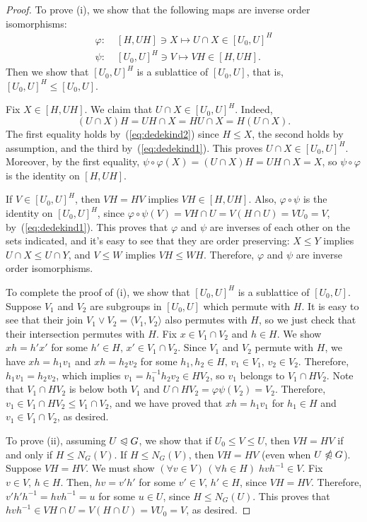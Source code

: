 \documentclass[cm,dissertation]{uhthesis}
\theoremstyle{plain}
\theoremstyle{definition}
\newcounter{claim}
\theoremstyle{remark}
\numberwithin{theorem}{section}
\numberwithin{claim}{chapter}
\numberwithin{equation}{section}
\numberwithin{conjecture}{chapter}
\newcommand{\<}{\ensuremath{\langle}}
\renewcommand{\>}{\ensuremath{\rangle}}
\renewcommand{\leq}{\ensuremath{\leqslant}}
\newcommand{\subnormal}{\ensuremath{\trianglelefteqslant}}
\newcommand{\notsubnormal}{\ensuremath{\ntrianglelefteqslant}}
\newcommand{\join}{\ensuremath{\vee}}
\newcommand{\0}{\ensuremath{\mathbf{0}}}
\newcommand{\1}{\ensuremath{\mathbf{1}}}
\newcommand{\2}{\ensuremath{\mathbf{2}}}
\newcommand{\3}{\ensuremath{\mathbf{3}}}
\newcommand{\4}{\ensuremath{\mathbf{4}}}
\newcommand{\5}{\ensuremath{\mathbf{5}}}
\renewcommand{\phi}{\ensuremath{\varphi}}
\begin{document}
\begin{proof}
To prove (i), we show that the following maps are inverse order isomorphisms:
\begin{align}
\label{eq:inverse-isos}
\phi: \;& [H, UH] \ni X \mapsto U\cap X \in [U_0, U]^H\\
\psi: \;& [U_0, U]^H \ni V \mapsto VH \in [H, UH].\nonumber
\end{align}
Then we show that $[U_0, U]^H$ is a sublattice of $[U_0,U]$, that is, 
$[U_0, U]^H\leq [U_0,U]$.

Fix $X\in [H, UH]$. We claim that $U\cap X \in [U_0, U]^H$. Indeed,
\[
    (U\cap X) H = UH \cap X=
               HU \cap X
                = H(U \cap X).
\]
The first equality holds by~(\ref{eq:dedekind2}) since $H\leq X$, the second holds
by assumption, and the third by~(\ref{eq:dedekind1}).
  This proves $U\cap X \in [U_0, U]^H$.  Moreover, by the first equality,
$\psi \circ \phi (X) = (U\cap X)H =UH \cap X = X$,
so $\psi \circ \phi$ is the identity on $[H, UH]$.

If $V\in [U_0, U]^H$, then $VH = HV$ implies $VH \in [H, UH]$. Also, $\phi \circ
\psi$ is the identity on $[U_0, U]^H$, since $\phi \circ \psi(V)= VH \cap U =
V(H\cap U)= VU_0 = V$, by~(\ref{eq:dedekind1}). 
This proves that $\phi$ and $\psi$ are inverses of each other on the sets indicated, and
it's easy to see that they are order preserving:
$X\leq Y$ implies $U\cap X \leq U\cap Y$, and $V\leq W$ implies $VH \leq WH$.
Therefore, $\phi$ and $\psi$ are inverse order isomorphisms.

To complete the proof of (i), we show that
$[U_0, U]^H$ is a sublattice of $[U_0, U]$.  Suppose $V_1$ and $V_2$ are
subgroups in $[U_0, U]$ which permute with $H$.  
It is easy to see that their join $V_1 \join V_2 = \<V_1, V_2\>$ also permutes
with $H$, so we just check that their intersection permutes with $H$.  Fix
$x \in V_1 \cap V_2$ and $h\in H$.  We show $xh = h'x'$ for some $h'\in H, \, x'
\in V_1\cap V_2$. Since $V_1$ and $V_2$ permute with $H$, we have $xh = h_1 v_1$
and $xh = h_2 v_2$ for some $h_1, h_2\in H, \, v_1 \in V_1, \, v_2 \in V_2$.
Therefore, $h_1 v_1 = h_2 v_2$, which implies $v_1 = h_1^{-1}h_2 v_2 \in HV_2$,
so $v_1$ belongs to $V_1 \cap HV_2$. Note that $V_1 \cap HV_2$ is below both $V_1$ and
$U\cap HV_2 = \phi \psi(V_2) = V_2$.  Therefore, $v_1 \in V_1 \cap HV_2 \leq V_1
\cap V_2$, and we have proved that $xh = h_1 v_1$ for $h_1\in H$ and $v_1 \in
V_1\cap V_2$, as desired. 

To prove (ii), assuming $U\subnormal G$, we show that if $U_0 \leq V \leq U$,
then $VH = HV$ if and only if $H\leq N_G(V)$.
If $H\leq N_G(V)$, then $VH = HV$ (even when $U \notsubnormal G$).
Suppose $VH = HV$.  We must show $(\forall v\in V)\, (\forall h\in H)\; hvh^{-1}\in
V$.  Fix $v\in V, \, h\in H$.  Then, $hv = v'h'$ for some $v'\in V,\, h'\in H$, since
$VH = HV$.  Therefore, $v' h' h^{-1} = hvh^{-1} = u$ for some $u\in U$, since
$H\leq N_G(U)$. This proves that $hvh^{-1}\in VH\cap U = V(H\cap U) = VU_0 = V$, as
desired.
\end{proof}
\end{document}
